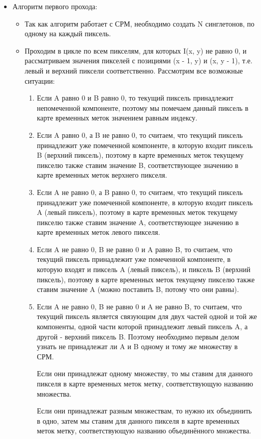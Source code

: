 \documentclass{report}
\begin{document}
		\begin{itemize}
			\item Алгоритм первого прохода:
			\begin{itemize}
				\item Так как алгоритм работает с СРМ, необходимо создать N синглетонов, по одному на каждый пиксель.
				\item Проходим в цикле по всем пикселям, для которых I(x, y) не равно 0, и рассматриваем значения пикселей с позициями (x - 1, y) и (x, y - 1), т.е. левый и верхний пиксели соответственно. Рассмотрим все возможные ситуации:
				\begin{enumerate}
					\item Если A равно 0 и B равно 0, то текущий пиксель принадлежит непомеченной компоненте, поэтому мы помечаем данный пиксель в карте временных меток значением равным индексу.
					\item Если A равно 0, а B не равно 0, то считаем, что текущий пиксель принадлежит уже помеченной компоненте, в которую входит пиксель B (верхний пиксель), поэтому в карте временных меток текущему пикселю также ставим значение B, соответствующее значению в карте временных меток верхнего пикселя.
					\item Если A не равно 0, а B равно 0, то считаем, что текущий пиксель принадлежит уже помеченной компоненте, в которую входит пиксель A (левый пиксель), поэтому в карте временных меток текущему пикселю также ставим значение A, соответствующее значению в карте временных меток левого пикселя.
					\item Если A не равно 0, B не равно 0 и A равно B, то считаем, что текущий пиксель принадлежит уже помеченной компоненте, в которую входят и пиксель A (левый пиксель), и пиксель B (верхний пиксель), поэтому в карте временных меток текущему пикселю также ставим значение A (можно поставить B, потому что они равны).
					\item Если A не равно 0, B не равно 0 и A не равно B, то считаем, что текущий пиксель является связующим для двух частей одной и той же компоненты, одной части которой принадлежит левый пиксель A, а другой - верхний пиксель B. Поэтому необходимо первым делом узнать не принадлежат ли A и B одному и тому же множеству в СРМ. 
					\par Если они принадлежат одному множеству, то мы ставим для данного пикселя в карте временных меток метку, соответствующую названию множества. 
					\par Если они принадлежат разным множествам, то нужно их объединить в одно, затем мы ставим для данного пикселя в карте временных меток метку, соответствующую названию объединённого множества.

\end{enumerate}
\end{itemize}
\end{itemize}
\end{document}
